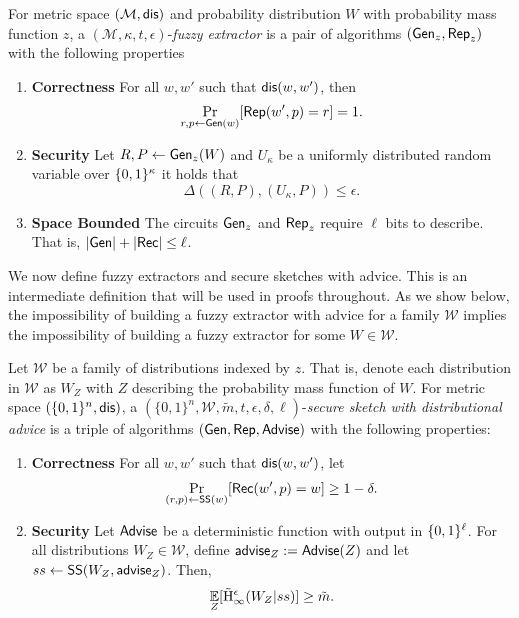 \begin{definition}
For metric space $(\mathcal{M}, \mathsf{dis})$ and probability distribution $W$ with probability mass function $z$, a $(\mathcal{M}, \kappa, t, \epsilon)$-\emph{fuzzy extractor} is a pair of algorithms $({\mathsf{Gen}}_z, {\mathsf{Rep}}_z)$ with the following properties 
\begin{enumerate} 
\itemsep0em
\item \textbf{Correctness} For all $w, w'$ such that $\mathsf{dis}(w, w')$, then 
\[\Pr_{r, p \leftarrow {\ensuremath{\mathsf{Gen}}}(w)}[{\mathsf{Rep}}(w', p) = r]=1.\] 
\item \textbf{Security} Let $R, P \leftarrow {\ensuremath{\mathsf{Gen}}}_z(W)$ and $U_\kappa$ be a uniformly distributed random variable over $\{0, 1\}^\kappa$ it holds that \[\Delta((R, P), (U_\kappa, P))\le \epsilon.\]
\item  \textbf{Space Bounded} The circuits ${\mathsf{Gen}}_z$ and ${\mathsf{Rep}}_z$ require $\ell$ bits to describe.  That is, $|{\mathsf{Gen}}| +|{\mathsf{Rec}}|\le \ell$.
\end{enumerate}
\label{def:fe}
\end{definition}

\noindent
We now define fuzzy extractors and secure sketches with advice.  This is an intermediate definition that will be used in proofs throughout.  As we show below, the impossibility of building a fuzzy extractor with advice for a family $\mathcal{W}$ implies the impossibility of building a fuzzy extractor for some $W\in\mathcal{W}$.

\begin{definition}
\label{def:ss distributional}
Let $\mathcal{W}$ be a family of distributions indexed by $z$.  That is, denote each distribution in $\mathcal{W}$ as $W_Z$ with $Z$ describing the probability mass function of $W$.  
For metric space $(\{0,1\}^n, \mathsf{dis})$, a $(\{0,1\}^n, \mathcal{W}, \tilde{m}, t, \epsilon, \delta, \ell)$-\emph{secure sketch with distributional advice} is a triple of algorithms $({\mathsf{Gen}}, {\mathsf{Rep}}, {\mathsf{Advise}})$ with the following properties:
\begin{enumerate} 
\itemsep0em
\item \textbf{Correctness} For all $w, w'$ such that $\mathsf{dis}(w, w')$, let \[\Pr_{(r, p) \leftarrow {\ensuremath{\mathsf{SS}}}(w)}[{\mathsf{Rec}}(w', p) = w]\ge 1-\delta.\]
\item \textbf{Security} Let ${\mathsf{Advise}}$ be a deterministic function with output in $\{0, 1\}^\ell$.  For all distributions $W_Z \in \mathcal{W}$, define ${\mathsf{advise}}_Z:= {\mathsf{Advise}}(Z)$ and let $ss \leftarrow {\ensuremath{\mathsf{SS}}}(W_Z, {\mathsf{advise}}_Z)$. Then,
\[
\operatorname*{\mathbb{E}}_{Z} [\tilde{\mathrm{H}}_\infty^\epsilon(W_Z| ss)] \ge \tilde{m}.
\]
\end{enumerate}
\end{definition}


